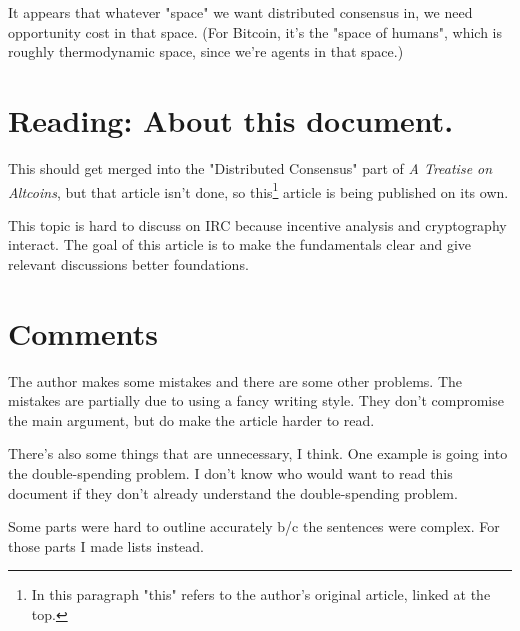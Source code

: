 \documentclass{article}
\begin{document}
It appears that whatever "space" we want distributed consensus in, we need opportunity cost in that space. (For Bitcoin, it's the "space of humans", which is roughly thermodynamic space, since we're agents in that space.)

\section{Reading: About this document.}

This should get merged into the "Distributed Consensus" part of \emph{A Treatise on Altcoins}, but that article isn't done, so this\footnote{In this paragraph "this" refers to the author's original article, linked at the top.} article is being published on its own.

This topic is hard to discuss on IRC because incentive analysis and cryptography interact. The goal of this article is to make the fundamentals clear and give relevant discussions better foundations.

\section{Comments}

The author makes some mistakes and there are some other problems. The mistakes are partially due to using a fancy writing style. They don't compromise the main argument, but do make the article harder to read.

There's also some things that are unnecessary, I think. One example is going into the double-spending problem. I don't know who would want to read this document if they don't already understand the double-spending problem.

Some parts were hard to outline accurately b/c the sentences were complex. For those parts I made lists instead.
\end{document}
